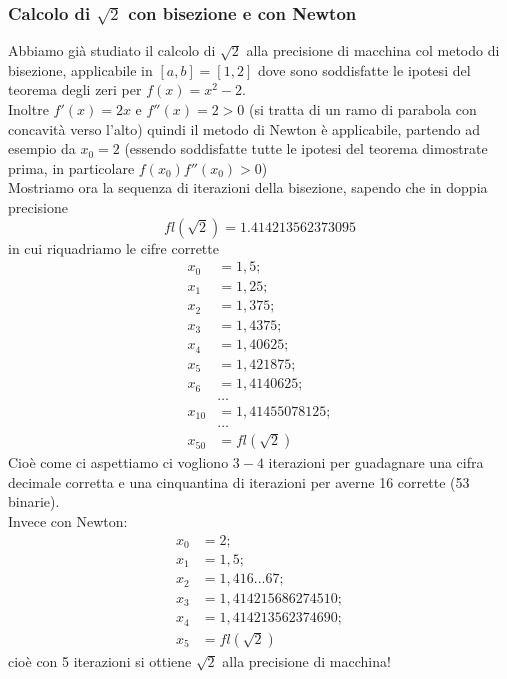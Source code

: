 \subsubsection{Calcolo di $\sqrt{2}$ con bisezione e con Newton}
Abbiamo già studiato il calcolo di $\sqrt{2}$ alla precisione di macchina col metodo di bisezione, applicabile in $[a,b]=[1,2]$ dove sono soddisfatte le ipotesi del teorema degli zeri per $f(x)=x^2-2$.\\ Inoltre $f'(x)=2x$ e $f''(x)=2>0$ (si tratta di un ramo di parabola con concavità verso l'alto) quindi il metodo di Newton è applicabile, partendo ad esempio da $x_0=2$ (essendo soddisfatte tutte le ipotesi del teorema dimostrate prima, in particolare $f(x_0)f''(x_0)>0$)\\
Mostriamo ora la sequenza di iterazioni della bisezione, sapendo che in doppia precisione
\[ fl(\sqrt{2})=1.414213562373095 \]
in cui riquadriamo le cifre corrette
\[ \begin{split}
    x_0 & = \boxed{1},5; \\
    x_1 & = \boxed{1},25; \\
    x_2 & = \boxed{1},375; \\
    x_3 & = \boxed{1,4}375; \\
    x_4 & = \boxed{1,4}0625; \\
    x_5 & = \boxed{1,4}21875; \\
    x_6 & = \boxed{1,41}40625; \\ 
    & \dotso \\
    x_{10} & = \boxed{1,414}55078125; \\
    & \dotso \\
    x_{50} & = fl(\sqrt{2})
\end{split} \]
Cioè come ci aspettiamo ci vogliono $3-4$ iterazioni per guadagnare una cifra decimale corretta e una cinquantina di iterazioni per averne 16 corrette (53 binarie).\\
Invece con Newton:
\[ \begin{split}
    x_0 & = 2; \\
    x_1 & = \boxed{1},5; \\
    x_2 & = \boxed{1,41}6...67; \\
    x_3 & = \boxed{1,41421}5686274510; \\ 
    x_4 & = \boxed{1,41421356237}4690; \\ 
    x_5 & = fl(\sqrt{2})
\end{split} \]
cioè con 5 iterazioni si ottiene $\sqrt{2}$ alla precisione di macchina!\\
